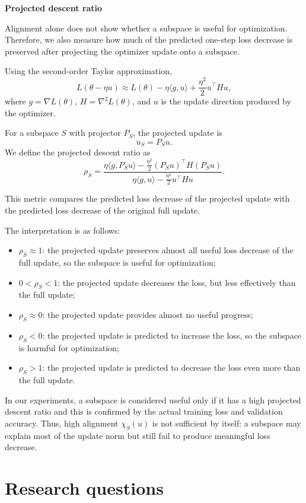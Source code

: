 \documentclass[conference]{IEEEtran}
\begin{document}
\textbf{Projected descent ratio}

Alignment alone does not show whether a subspace is useful for optimization. 
Therefore, we also measure how much of the predicted one-step loss decrease is preserved after projecting the optimizer update onto a subspace.

Using the second-order Taylor approximation,
\[
L(\theta-\eta u)
\approx
L(\theta)
-
\eta \langle g, u\rangle
+
\frac{\eta^2}{2}u^\top H u,
\]
where \(g=\nabla L(\theta)\), \(H=\nabla^2L(\theta)\), and \(u\) is the update direction produced by the optimizer.

For a subspace \(S\) with projector \(P_S\), the projected update is
\[
u_S = P_S u.
\]
We define the projected descent ratio as
\[
\rho_S
=
\frac{
\eta \langle g, P_Su\rangle
-
\frac{\eta^2}{2}(P_Su)^\top H(P_Su)
}{
\eta \langle g, u\rangle
-
\frac{\eta^2}{2}u^\top H u
}.
\]

This metric compares the predicted loss decrease of the projected update with the predicted loss decrease of the original full update.

The interpretation is as follows:
\begin{itemize}
    \item \(\rho_S \approx 1\): the projected update preserves almost all useful loss decrease of the full update, so the subspace is useful for optimization;
    \item \(0 < \rho_S < 1\): the projected update decreases the loss, but less effectively than the full update;
    \item \(\rho_S \approx 0\): the projected update provides almost no useful progress;
    \item \(\rho_S < 0\): the projected update is predicted to increase the loss, so the subspace is harmful for optimization;
    \item \(\rho_S > 1\): the projected update is predicted to decrease the loss even more than the full update.
\end{itemize}

In our experiments, a subspace is considered useful only if it has a high projected descent ratio and this is confirmed by the actual training loss and validation accuracy. Thus, high alignment \(\chi_S(u)\) is not sufficient by itself: a subspace may explain most of the update norm but still fail to produce meaningful loss decrease.

\section{Research questions}
\end{document}

